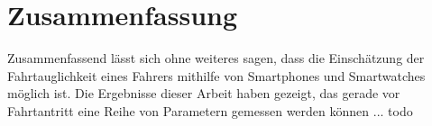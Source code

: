 \section{Zusammenfassung}
\label{conclusion}
Zusammenfassend lässt sich ohne weiteres sagen, dass die Einschätzung der Fahrtauglichkeit eines Fahrers mithilfe von Smartphones und Smartwatches möglich ist. Die Ergebnisse dieser Arbeit haben gezeigt, das gerade vor Fahrtantritt eine Reihe von Parametern gemessen werden können ... todo